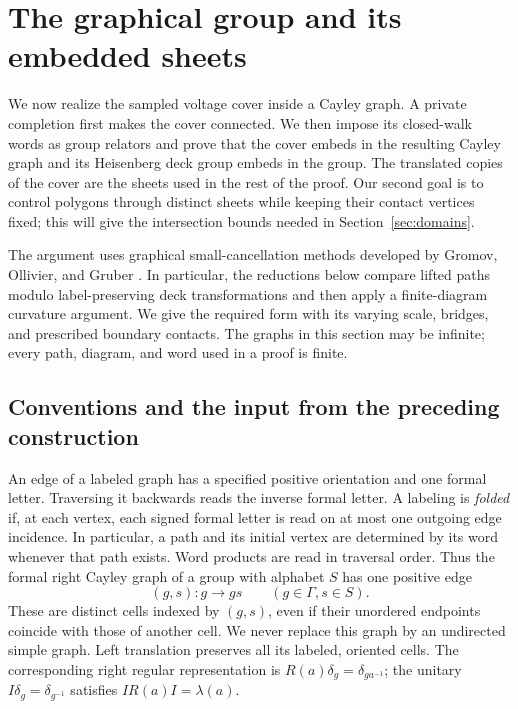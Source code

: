 \section{The graphical group and its embedded sheets}
\label{sec:geometry}

We now realize the sampled voltage cover inside a Cayley graph.  A private
completion first makes the cover connected.  We then impose its closed-walk
words as group relators and prove that the cover embeds in the resulting
Cayley graph and its Heisenberg deck group embeds in the group.  The
translated copies of the cover
are the sheets used in the rest of the proof.  Our second goal is to control
polygons through distinct sheets while keeping their contact vertices fixed;
this will give the intersection bounds needed in Section~\ref{sec:domains}.

The argument uses graphical small-cancellation methods developed by
Gromov, Ollivier, and Gruber
\cite[\S2.3]{Gro03}\cite[\S\S2--3]{Oll06}
\cite[Definition~1.3 and Lemma~4.1]{Gru15}.
In particular, the reductions below compare lifted paths modulo
label-preserving deck transformations and then apply a finite-diagram
curvature argument.  We give the required form with its varying scale,
bridges, and prescribed boundary contacts.  The graphs in this section may
be infinite; every path, diagram, and word used in a proof is finite.

\subsection{Conventions and the input from the preceding construction}

An edge of a labeled graph has a specified positive orientation and one
formal letter.  Traversing it backwards reads the inverse formal letter.
A labeling is \emph{folded} if, at each vertex, each signed formal letter is
read on at most one outgoing edge incidence.  In particular, a path and its
initial vertex are determined by its word whenever that path exists.  Word
products are read in traversal order.  Thus the formal right Cayley graph
of a group with alphabet $S$ has one positive edge
\[
 (g,s)\colon g\longrightarrow gs\qquad(g\in\Gamma, s\in S).
\]
These are distinct cells indexed by $(g,s)$, even if their unordered endpoints
coincide with those of another cell.  We never replace this graph by an
undirected simple graph.  Left translation preserves all its labeled,
oriented cells.  The corresponding right regular representation is
$R(a)\delta_g=\delta_{ga^{-1}}$; the unitary
$I\delta_g=\delta_{g^{-1}}$ satisfies $IR(a)I=\lambda(a)$.

